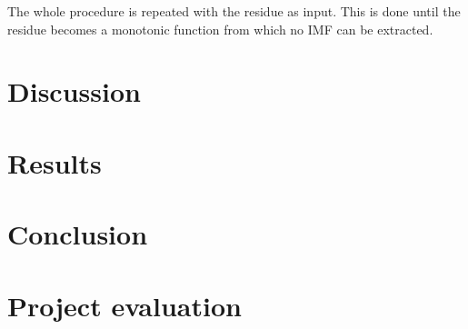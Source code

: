 \documentclass[12pt]{article}
\begin{document}
The whole procedure is repeated with the residue as input. This is done until the residue becomes a monotonic function from which no IMF can be extracted. 



\section{Discussion}
\label{discussion}




\section{Results}
\label{results}




\section{Conclusion}
\label{conclusion}




\section{Project evaluation}
\label{projectEvaluation}




\newpage




\appendix



\end{document}
